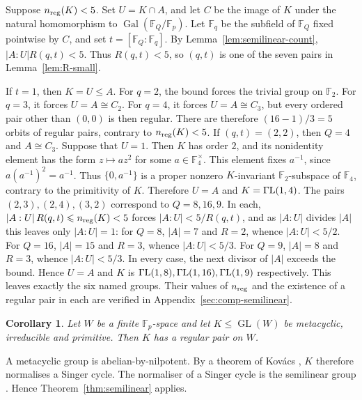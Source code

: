 \documentclass[10pt]{amsart}
\newtheorem{corollary}[theorem]{Corollary}
\theoremstyle{definition}
\renewcommand{\le}{\leqslant}
\renewcommand{\leq}{\leqslant}
\let\oldendproof\endproof
\renewenvironment{proof}[1][\proofname]{%
  \oldproof[\bfseries #1]%
}{\oldendproof}
\newcommand{\GammaL}{\Gamma{\rm L}}
\DeclareMathOperator{\Gal}{Gal}
\DeclareMathOperator{\GL}{GL}
\numberwithin{equation}{section}
\numberwithin{table}{section}
\begin{document}
\begin{proof}
Suppose $n_{\rm reg}(K)<5$. Set $U=K\cap A$, and let $C$ be the
image of $K$ under the natural homomorphism to
$\Gal(\mathbb{F}_Q/\mathbb{F}_p)$. Let $\mathbb{F}_q$ be the subfield of
$\mathbb{F}_Q$ fixed pointwise by $C$, and set
$t=[\mathbb{F}_Q:\mathbb{F}_q]$. By Lemma~\ref{lem:semilinear-count},
$|A:U|R(q,t)<5$. Thus $R(q,t)<5$, so $(q,t)$ is one of the seven
pairs in Lemma~\ref{lem:R-small}.

If $t=1$, then $K=U\le A$. For $q=2$, the bound forces the trivial group on
$\mathbb{F}_2$. For $q=3$, it forces $U=A\cong C_2$. For $q=4$, it forces
$U=A\cong C_3$, but every ordered pair other than $(0,0)$ is then regular.
There are therefore $(16-1)/3=5$ orbits of regular pairs, contrary to
$n_{\rm reg}(K)<5$. If $(q,t)=(2,2)$, then $Q=4$ and
$A\cong C_3$. Suppose that $U=1$. Then $K$ has order $2$, and its
nonidentity element has the form $z\mapsto az^2$ for some
$a\in\mathbb{F}_4^\times$. This element fixes $a^{-1}$, since
$a(a^{-1})^2=a^{-1}$.
Thus $\{0,a^{-1}\}$ is a proper nonzero $K$-invariant
$\mathbb{F}_2$-subspace of $\mathbb{F}_4$, contrary to the primitivity of $K$. Therefore
$U=A$ and $K=\GammaL(1,4)$. The pairs
$(2,3),(2,4),(3,2)$ correspond to $Q=8,16,9$. In each,
$|A:U|\,R(q,t)\le n_{\rm reg}(K)<5$
forces $|A:U|<5/R(q,t)$, and as $|A:U|$ divides $|A|$ this leaves only $|A:U|=1$:
for $Q=8$, $|A|=7$ and $R=2$, whence $|A:U|<5/2$. For $Q=16$, $|A|=15$
and $R=3$, whence $|A:U|<5/3$. For $Q=9$, $|A|=8$ and $R=3$, whence
$|A:U|<5/3$. In every case, the next divisor of $|A|$ exceeds the bound.
Hence $U=A$ and $K$ is
$\GammaL(1,8),\GammaL(1,16),\GammaL(1,9)$ respectively. This leaves exactly
the six named groups. Their values of $n_{\rm reg}$ and the existence of a
regular pair in each are verified in Appendix~\ref{sec:comp-semilinear}.
\end{proof}

\begin{corollary}\label{cor:metacyclic}
Let $W$ be a finite $\mathbb{F}_p$-space and let $K\leq\GL(W)$ be
metacyclic, irreducible and primitive. Then $K$ has a regular pair on $W$.
\end{corollary}

\begin{proof}
A metacyclic group is abelian-by-nilpotent. By a theorem of Kov\'acs
\cite[Theorem~5.3.1]{Short92}, $K$ therefore normalises a Singer cycle.
The normaliser of a Singer cycle is the semilinear group
\cite[Theorem~2.3.5]{Short92}. Hence Theorem~\ref{thm:semilinear} applies.
\end{proof}
\end{document}
